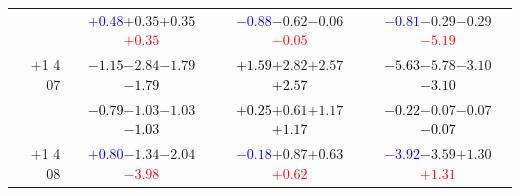 \documentclass[compress]{beamer}
\begin{document}
\begin{frame}
\begin{tabular}{r | c | c | c}
          & \textcolor{blue}{$+0.48$}\hspace{0.1 cm}$+0.35$\hspace{0.1 cm}$+0.35$\hspace{0.1 cm}\textcolor{red}{$+0.35$} & \textcolor{blue}{$-0.88$}\hspace{0.1 cm}$-0.62$\hspace{0.1 cm}$-0.06$\hspace{0.1 cm}\textcolor{red}{$-0.05$} & \textcolor{blue}{$-0.81$}\hspace{0.1 cm}$-0.29$\hspace{0.1 cm}$-0.29$\hspace{0.1 cm}\textcolor{red}{$-5.19$} \\
$+$1 4 07 & \textcolor{black}{$-1.15$}\hspace{0.1 cm}$-2.84$\hspace{0.1 cm}$-1.79$\hspace{0.1 cm}\textcolor{black}{$-1.79$} & \textcolor{black}{$+1.59$}\hspace{0.1 cm}$+2.82$\hspace{0.1 cm}$+2.57$\hspace{0.1 cm}\textcolor{black}{$+2.57$} & \textcolor{black}{$-5.63$}\hspace{0.1 cm}$-5.78$\hspace{0.1 cm}$-3.10$\hspace{0.1 cm}\textcolor{black}{$-3.10$} \\
          & \textcolor{black}{$-0.79$}\hspace{0.1 cm}$-1.03$\hspace{0.1 cm}$-1.03$\hspace{0.1 cm}\textcolor{black}{$-1.03$} & \textcolor{black}{$+0.25$}\hspace{0.1 cm}$+0.61$\hspace{0.1 cm}$+1.17$\hspace{0.1 cm}\textcolor{black}{$+1.17$} & \textcolor{black}{$-0.22$}\hspace{0.1 cm}$-0.07$\hspace{0.1 cm}$-0.07$\hspace{0.1 cm}\textcolor{black}{$-0.07$} \\
$+$1 4 08 & \textcolor{blue}{$+0.80$}\hspace{0.1 cm}$-1.34$\hspace{0.1 cm}$-2.04$\hspace{0.1 cm}\textcolor{red}{$-3.98$} & \textcolor{blue}{$-0.18$}\hspace{0.1 cm}$+0.87$\hspace{0.1 cm}$+0.63$\hspace{0.1 cm}\textcolor{red}{$+0.62$} & \textcolor{blue}{$-3.92$}\hspace{0.1 cm}$-3.59$\hspace{0.1 cm}$+1.30$\hspace{0.1 cm}\textcolor{red}{$+1.31$} \\

\end{tabular}
\end{frame}
\end{document}
